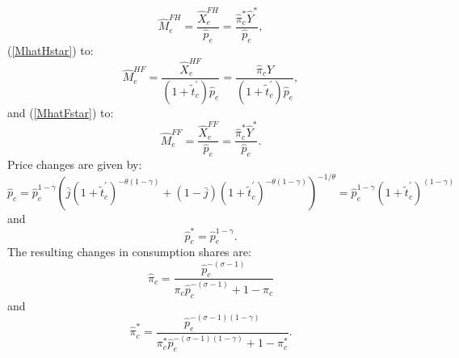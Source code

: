 \documentclass[notitlepage,12pt]{article}
\begin{document}
\begin{equation*}
\hat{M}_{e}^{FH}=\frac{\hat{X}_{e}^{FH}}{\hat{p}_{e}}=\frac{\hat{\pi}%
_{c}^{\ast }\hat{Y}^{\ast }}{\hat{p}_{e}},
\end{equation*}%
(\ref{MhatHstar}) to:%
\begin{equation*}
\hat{M}_{e}^{HF}=\frac{\hat{X}_{e}^{HF}}{\left( 1+\tilde{t}_{c}^{\prime
}\right) \hat{p}_{e}}=\frac{\hat{\pi}_{c}\hat{Y}}{\left( 1+\tilde{t}%
_{c}^{\prime }\right) \hat{p}_{e}},
\end{equation*}%
and (\ref{MhatFstar}) to:%
\begin{equation*}
\hat{M}_{e}^{FF}=\frac{\hat{X}_{e}^{FF}}{\hat{p}_{e}}=\frac{\hat{\pi}%
_{c}^{\ast }\hat{Y}^{\ast }}{\hat{p}_{e}}.
\end{equation*}%
Price changes are given by:%
\begin{equation*}
\hat{p}_{c}=\hat{p}_{e}^{1-\gamma }\left( \bar{j}\left( 1+\tilde{t}%
_{c}^{\prime }\right) ^{-\theta \left( 1-\gamma \right) }+\left( 1-\bar{j}%
\right) \left( 1+\tilde{t}_{c}^{\prime }\right) ^{-\theta \left( 1-\gamma
\right) }\right) ^{-1/\theta }=\hat{p}_{e}^{1-\gamma }\left( 1+\tilde{t}%
_{c}^{\prime }\right) ^{\left( 1-\gamma \right) }
\end{equation*}%
and%
\begin{equation*}
\hat{p}_{c}^{\ast }=\hat{p}_{e}^{1-\gamma }.
\end{equation*}%
The resulting changes in consumption shares are:%
\begin{equation*}
\hat{\pi}_{c}=\frac{\hat{p}_{c}^{-\left( \sigma -1\right) }}{\pi _{c}\hat{p}%
_{c}^{-\left( \sigma -1\right) }+1-\pi _{c}}
\end{equation*}%
and%
\begin{equation*}
\hat{\pi}_{c}^{\ast }=\frac{\hat{p}_{e}^{-\left( \sigma -1\right) \left(
1-\gamma \right) }}{\pi _{c}^{\ast }\hat{p}_{e}^{-\left( \sigma -1\right)
\left( 1-\gamma \right) }+1-\pi _{c}^{\ast }}.
\end{equation*}
\end{document}
